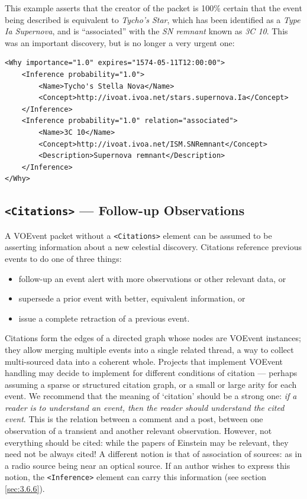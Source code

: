 \documentclass[11pt,a4paper]{ivoa}
\begin{document}
This example asserts that the creator of the packet is 100\% certain that the event being described is equivalent to \emph{Tycho's Star}, which has been identified as a \emph{Type Ia Supernova}, and is ``associated'' with the \emph{SN remnant} known as \emph{3C 10}. This was an important discovery, but is no longer a very urgent one: 
{\footnotesize
\begin{verbatim}
<Why importance="1.0" expires="1574-05-11T12:00:00">
    <Inference probability="1.0">
        <Name>Tycho's Stella Nova</Name>
        <Concept>http://ivoat.ivoa.net/stars.supernova.Ia</Concept>
    </Inference>     
    <Inference probability="1.0" relation="associated">
        <Name>3C 10</Name>
        <Concept>http://ivoat.ivoa.net/ISM.SNRemnant</Concept>
        <Description>Supernova remnant</Description>
    </Inference>
</Why> 
\end{verbatim}}

\subsection{{\tt <Citations>} --- Follow-up Observations}
\label{sec:3.7}
A VOEvent packet without a {\tt <Citations>} element can be assumed to be asserting information about a new celestial discovery. Citations reference previous events to do one of three things: 
\begin{itemize}
\item follow-up an event alert with more observations or other relevant data, or
\item supersede a prior event with better, equivalent information, or
\item issue a complete retraction of a previous event.
\end{itemize}

Citations form the edges of a directed graph whose nodes are VOEvent instances; they allow merging multiple events into a single related thread, a way to collect multi-sourced data into a coherent whole. Projects that implement VOEvent handling may decide to implement for different conditions of citation --- perhaps assuming a sparse or structured citation graph, or a small or large arity for each event. We recommend that the meaning of `citation' should be a strong one: \emph{if a reader is to understand an event, then the reader should understand the cited event}. This is the relation between a comment and a post, between one observation of a transient and another relevant observation. However, not everything should be cited: while the papers of Einstein may be relevant, they need not be always cited! A different notion is that of association of sources: as in a radio source being near an optical source. If an author wishes to express this notion, the {\tt <Inference>} element can carry this information (see section \ref{sec:3.6.6}). 
\end{document}
